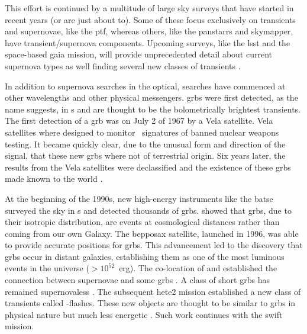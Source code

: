 This effort is continued by a multitude of large sky surveys that have started in recent years (or are just about to). Some of these focus exclusively on transients and supernovae, like the \gls{ptf}, whereas others, like the \gls{panstarrs} and \gls{skymapper}, have transient/supernova components. Upcoming surveys, like the \gls{lsst} and the space-based \gls{gaia} mission, will provide unprecedented detail about current supernova types as well finding several new classes of transients \citep[e.g. \gls{gaia} will find $\approx14,000$ \sneia\ during its mission lifetime;][]{2003MNRAS.341..569B}.

In addition to supernova searches in the optical, searches have commenced at other wavelengths and other physical messengers. \glspl{grb} were first detected, as the name suggests, in \gammaray s and are thought to be the bolometrically brightest  transients. The first detection of a \gls{grb} was on July 2 of 1967 by a Vela satellite. Vela satellites where designed to monitor \gammaray\ signatures of banned nuclear weapons testing. It became quickly clear, due to the unusual form and direction of the signal, that these new \glspl{grb} where not of terrestrial origin. Six years later, the results from the Vela satellites were declassified and the existence of these \glspl{grb} made known to the world \citep{1973ApJ...182L..85K}. 


At the beginning of the 1990s, new high-energy instruments like the \gls{batse} surveyed the sky in \gammaray s and detected thousands of \glspl{grb}. \citet{1992Natur.355..143M} showed that \glspl{grb}, due to their isotropic distribution, are events at cosmological distances rather than coming from our own Galaxy. The \gls{bepposax} satellite, launched in 1996, was able to provide accurate positions for \glspl{grb}. This advancement led to the discovery that \glspl{grb} occur in distant galaxies, establishing them as one of the most luminous events in the universe ($>10^{52}$~erg). The co-location of  and  established the connection between supernovae and some \glspl{grb} \citep{1998Natur.395..670G}. A class of short \glspl{grb} has remained supernovaless  \citep[e.g.]{2009ApJ...696..971X}. The subsequent \gls{hete2} mission established a new class of transients called \xray-flashes. These new objects are thought to be similar to  \glspl{grb} in physical nature but much less energetic \citep{2004ApJ...601L.119Z}. Such work continues with the \gls{swift} mission. 

